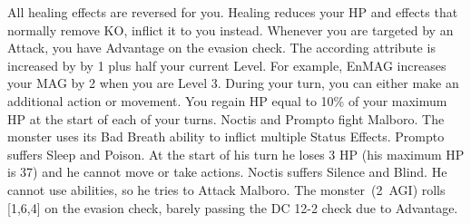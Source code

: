%
 All healing effects are reversed for you. Healing reduces your HP and effects that normally remove KO, inflict it to you instead.\ofgap
%	
 Whenever you are targeted by an Attack, you have Advantage on the evasion check. \ofgap
%
 The according attribute is increased by by 1 plus half your current Level. For example, EnMAG increases your MAG by 2 when you are Level 3. \ofgap
%
 During your turn, you can either make an additional action or movement. \ofgap
%
 You regain HP equal to 10\% of your maximum HP at the start of each of your turns.
%
\vfill
%
{
	Noctis and Prompto fight Malboro. 
	The monster uses its Bad Breath ability to inflict multiple Status Effects.
	Prompto suffers Sleep and Poison.
	At the start of his turn he loses 3 HP (his maximum HP is 37) and he cannot move or take actions.
	Noctis suffers Silence and Blind.
	He cannot use abilities, so he tries to Attack Malboro. 
	The monster~(2~AGI) rolls [1,6,4] on the evasion check, barely passing the DC 12-2 check due to Advantage.
}
%
\clearpage
